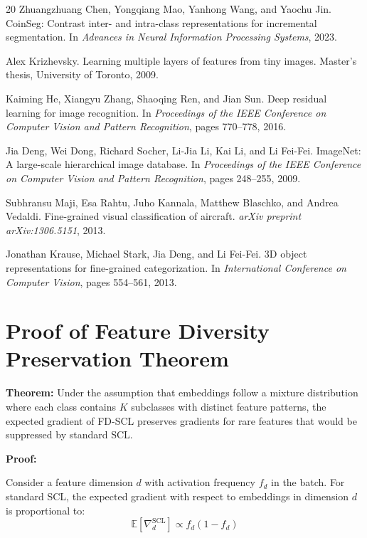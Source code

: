 \documentclass[11pt,a4paper]{article}
\begin{document}
\begin{thebibliography}{20}
Zhuangzhuang Chen, Yongqiang Mao, Yanhong Wang, and Yaochu Jin.
\newblock CoinSeg: Contrast inter- and intra-class representations for incremental segmentation.
\newblock In \emph{Advances in Neural Information Processing Systems}, 2023.

Alex Krizhevsky.
\newblock Learning multiple layers of features from tiny images.
\newblock Master's thesis, University of Toronto, 2009.

Kaiming He, Xiangyu Zhang, Shaoqing Ren, and Jian Sun.
\newblock Deep residual learning for image recognition.
\newblock In \emph{Proceedings of the IEEE Conference on Computer Vision and Pattern Recognition}, pages 770--778, 2016.

Jia Deng, Wei Dong, Richard Socher, Li-Jia Li, Kai Li, and Li Fei-Fei.
\newblock ImageNet: A large-scale hierarchical image database.
\newblock In \emph{Proceedings of the IEEE Conference on Computer Vision and Pattern Recognition}, pages 248--255, 2009.

Subhransu Maji, Esa Rahtu, Juho Kannala, Matthew Blaschko, and Andrea Vedaldi.
\newblock Fine-grained visual classification of aircraft.
\newblock \emph{arXiv preprint arXiv:1306.5151}, 2013.

Jonathan Krause, Michael Stark, Jia Deng, and Li Fei-Fei.
\newblock 3D object representations for fine-grained categorization.
\newblock In \emph{International Conference on Computer Vision}, pages 554--561, 2013.

\end{thebibliography}

\newpage
\appendix

\section{Proof of Feature Diversity Preservation Theorem}

\textbf{Theorem:} Under the assumption that embeddings follow a mixture distribution where each class contains $K$ subclasses with distinct feature patterns, the expected gradient of FD-SCL preserves gradients for rare features that would be suppressed by standard SCL.

\textbf{Proof:}

Consider a feature dimension $d$ with activation frequency $f_d$ in the batch. For standard SCL, the expected gradient with respect to embeddings in dimension $d$ is proportional to:
\begin{equation}
\mathbb{E}[\nabla_d^{\text{SCL}}] \propto f_d(1 - f_d)
\end{equation}
\end{document}
